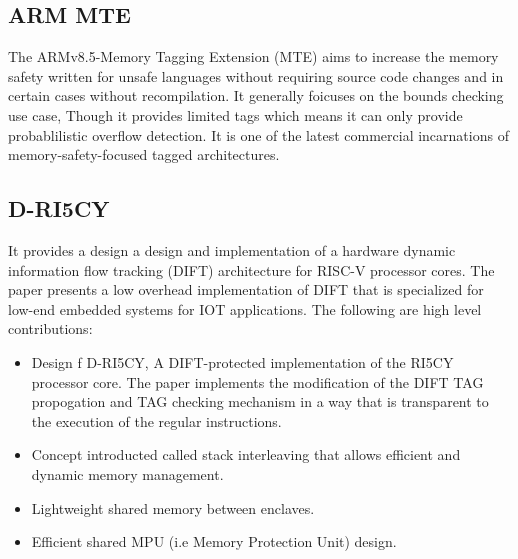 	
\subsection{ARM MTE \cite{ARMMTE}}
The ARMv8.5-Memory Tagging Extension (MTE) aims to increase the memory safety written for 
unsafe languages without requiring source code changes and in certain cases without 
recompilation. It generally foicuses on the bounds checking use case, Though it 
provides limited tags which means it can only provide probablilistic overflow detection. 
It is one of the latest commercial incarnations of memory-safety-focused tagged architectures.   

\subsection{D-RI5CY \cite{D-RISCY}}
It provides a design a design and implementation of a hardware dynamic information flow 
tracking (DIFT) architecture for RISC-V processor cores. The paper presents a low 
overhead implementation of DIFT that is specialized for low-end embedded systems
for IOT applications. The following are high level contributions:
\begin{itemize}
  \item Design f D-RI5CY, A DIFT-protected implementation of the RI5CY processor core. 
        The paper implements the modification of the DIFT TAG propogation and TAG checking
        mechanism in a way that is transparent to the execution of the regular instructions. 
  \item Concept introducted called stack interleaving that allows efficient and dynamic memory management.
  \item Lightweight shared memory between enclaves.
  \item Efficient shared MPU (i.e Memory Protection Unit) design.
\end{itemize}




